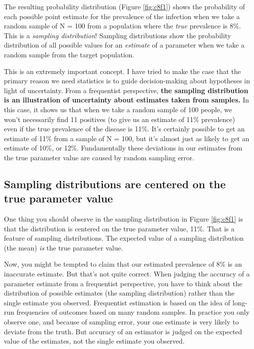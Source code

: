 \documentclass[
]{book}
\begin{document}
The resulting probability distribution (Figure \ref{fig:c8f1}) shows the probability of each possible point estimate for the prevalence of the infection when we take a random sample of N = 100 from a population where the \emph{true} prevalence is 8\%. This is a \emph{sampling distribution}! Sampling distributions show the probability distribution of all possible values for an \emph{estimate} of a parameter when we take a random sample from the target population.

This is an extremely important concept. I have tried to make the case that the primary reason we need statistics is to guide decision-making about hypotheses in light of uncertainty. From a frequentist perspective, \textbf{the sampling distribution is an illustration of uncertainty about estimates taken from samples.} In this case, it shows us that when we take a random sample of 100 people, we won't necessarily find 11 positives (to give us an estimate of 11\% prevalence) even if the true prevalence of the disease is 11\%. It's certainly possible to get an estimate of 11\% from a sample of N = 100, but it's almost just as likely to get an estimate of 10\%, or 12\%. Fundamentally these deviations in our estimates from the true parameter value are caused by random sampling error.

\subsection{Sampling distributions are centered on the true parameter value}\label{sampling-distributions-are-centered-on-the-true-parameter-value}

One thing you should observe in the sampling distribution in Figure \ref{fig:c8f1} is that the distribution is centered on the true parameter value, 11\%. That is a feature of sampling distributions. The expected value of a sampling distribution (the mean) \emph{is} the true parameter value.

Now, you might be tempted to claim that our estimated prevalence of 8\% is an inaccurate estimate. But that's not quite correct. When judging the accuracy of a parameter estimate from a frequentist perspective, you have to think about the distribution of possible estimates (the sampling distribution) rather than the single estimate you observed. Frequentist estimation is based on the idea of long-run frequencies of outcomes based on many random samples. In practice you only observe one, and because of sampling error, your one estimate is very likely to deviate from the truth. But accuracy of an estimator is judged on the expected value of the estimates, not the single estimate you observed.
\end{document}

